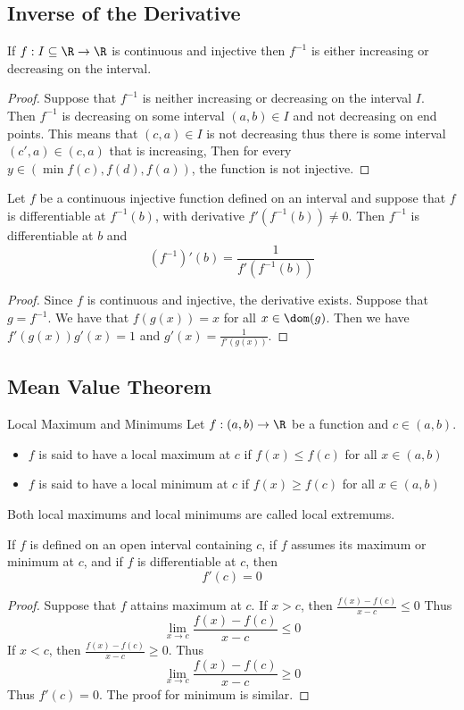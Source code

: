 \subsection{Inverse of the Derivative}
\begin{thm}{}{} If $f:I\subseteq\R\to\R$ is continuous and injective then $f^{-1}$ is either increasing or decreasing on the interval. \tcbline
\begin{proof} Suppose that $f^{-1}$ is neither increasing or decreasing on the interval $I$. Then $f^{-1}$ is decreasing on some interval $(a,b)\in I$ and not decreasing on end points. This means that $(c,a)\in I$ is not decreasing thus there is some interval $(c',a)\in(c,a)$ that is increasing, Then for every $y\in(\min{f(c),f(d)},f(a))$, the function is not injective. 
\end{proof}
\end{thm}

\begin{thm}{}{} Let $f$ be a continuous injective function defined on an interval and suppose that $f$ is differentiable at $f^{-1}(b)$, with derivative $f'\left(f^{-1}(b)\right)\neq0$. Then $f^{-1}$ is differentiable at $b$ and $$\left(f^{-1}\right)'(b)=\frac{1}{f'\left(f^{-1}(b)\right)}$$ \tcbline
\begin{proof} Since $f$ is continuous and injective, the derivative exists. Suppose that $g=f^{-1}$. We have that $f(g(x))=x$ for all $x\in\dom(g)$. Then we have $f'(g(x))g'(x)=1$ and $g'(x)=\frac{1}{f'(g(x))}$. 
\end{proof}
\end{thm}

\subsection{Mean Value Theorem}
\begin{defn}{Local Maximum and Minimums}{} Let $f:(a,b)\to\R$ be a function and $c\in(a,b)$. 
\begin{itemize}
\item $f$ is said to have a local maximum at $c$ if $f(x)\leq f(c)$ for all $x\in(a,b)$
\item $f$ is said to have a local minimum at $c$ if $f(x)\geq f(c)$ for all $x\in(a,b)$
\end{itemize}
Both local maximums and local minimums are called local extremums. 
\end{defn}

\begin{thm}{}{} If $f$ is defined on an open interval containing $c$, if $f$ assumes its maximum or minimum at $c$, and if $f$ is differentiable at $c$, then $$f'(c)=0$$ \tcbline
\begin{proof} Suppose that $f$ attains maximum at $c$. If $x>c$, then $\frac{f(x)-f(c)}{x-c}\leq 0$ Thus $$\lim_{x\to c}\frac{f(x)-f(c)}{x-c}\leq 0$$ If $x<c$, then $\frac{f(x)-f(c)}{x-c}\geq 0$. Thus $$\lim_{x\to c}\frac{f(x)-f(c)}{x-c}\geq 0$$ Thus $f'(c)=0$. The proof for minimum is similar. 
\end{proof}
\end{thm}

